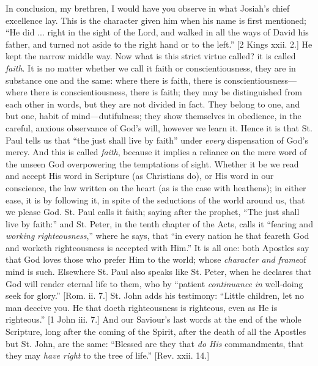 In conclusion, my brethren, I would have you observe in what
Josiah's chief excellence lay. This is the character given him when
his name is first mentioned; ``He did ... right in the sight of
the Lord, and walked in all the ways of David his father, and turned
not aside to the right hand or to the left.'' [2 Kings xxii. 2.]
He kept the narrow middle way. Now what is this strict virtue called?
it is called \emph{faith}. It is no matter whether we call it faith or
conscientiousness, they are in substance one and the same: where there
is faith, there is conscientiousness—where there is
conscientiousness, there is faith; they may be distinguished from each
other in words, but they are not divided in fact. They belong to one,
and but one, habit of mind—dutifulness; they show themselves in
obedience, in the careful, anxious observance of God's will, however
we learn it. Hence it is that St. Paul tells us that ``the just
shall live by faith'' under \emph{every} dispensation of God's
mercy. And this is called \emph{faith}, because it implies a reliance
on the mere word of the unseen God overpowering the temptations of
sight. Whether it be we read and accept His word in Scripture (as
Christians do), or His word in our conscience, the law written on the
heart (as is the case with heathens); in either ease, it is by
following it, in spite of the seductions of the world around us, that
we please God. St. Paul calls it faith; saying after the prophet,
``The just shall live by faith:'' and St. Peter, in the tenth
chapter of the Acts, calls it ``fearing and \emph{working} \emph{righteousness},''
where he says, that ``in every nation he that feareth God and
worketh righteousness is accepted with Him.'' It is all one: both
Apostles say that God loves those who prefer Him to the world; whose \emph{character
and frame}of mind is such. Elsewhere St. Paul also speaks like St.
Peter, when he declares that God will render eternal life to them, who
by ``patient \emph{continuance} \emph{in} well-doing seek for
glory.'' [Rom. ii. 7.] St. John adds his testimony: ``Little
children, let no man deceive you. He that doeth righteousness is
righteous, even as He is righteous.'' [1 John iii. 7.] And our
Saviour's last words at the end of the whole Scripture, long after the
coming of the Spirit, after the death of all the Apostles but St.
John, are the same: ``Blessed are they that \emph{do His}
commandments, that they may \emph{have right} to the tree of
life.'' [Rev. xxii. 14.]

